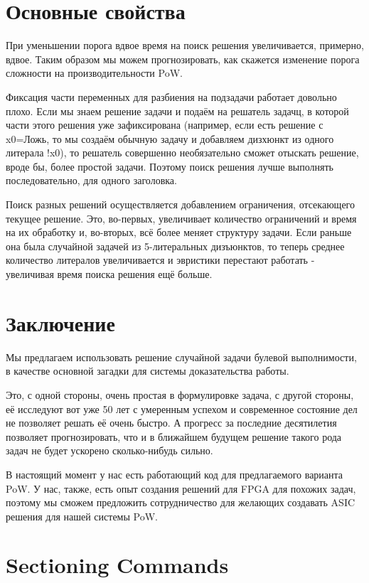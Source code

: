 \documentclass[acmlarge,screen]{acmart}
\begin{document}
\section{Основные свойства}

При уменьшении порога вдвое время на поиск решения увеличивается, примерно, вдвое. Таким образом мы 
можем прогнозировать, как скажется изменение порога сложности на производительности PoW.

Фиксация части переменных для разбиения на подзадачи работает довольно плохо. Если мы знаем решение 
задачи и подаём на решатель задачц, в которой части этого решения уже зафиксирована (например, если есть решение с x0=Ложь, то мы создаём обычную задачу и добавляем дизхюнкт из одного литерала {!x0}), то решатель совершенно необязательно сможет отыскать решение, вроде бы, более простой задачи. Поэтому поиск решения лучше выполнять последовательно, для одного заголовка.

Поиск разных решений осуществляется добавлением ограничения, отсекающего текущее решение. Это, 
во-первых, увеличивает количество ограничений и время на их обработку и, во-вторых, всё более меняет 
структуру задачи. Если раньше она была случайной задачей из 5-литеральных дизъюнктов, то теперь 
среднее количество литералов увеличивается и эвристики перестают работать - увеличивая время поиска 
решения ещё больше.

\section{Заключение}

Мы предлагаем использовать решение случайной задачи булевой выполнимости, в качестве основной 
загадки для системы доказательства работы.

Это, с одной стороны, очень простая в формулировке задача, с другой стороны, её исследуют вот уже 50 лет 
с умеренным успехом и современное состояние дел не позволяет решать её очень быстро. А прогресс 
за последние десятилетия позволяет прогнозировать, что и в ближайшем будущем решение такого рода задач 
не будет ускорено сколько-нибудь сильно.

В настоящий момент у нас есть работающий код для предлагаемого варианта PoW. У нас, также, 
есть опыт создания решений для FPGA для похожих задач, поэтому мы сможем предложить 
сотрудничество для желающих создавать ASIC решения для нашей системы PoW.

\section{Sectioning Commands}
\end{document}
